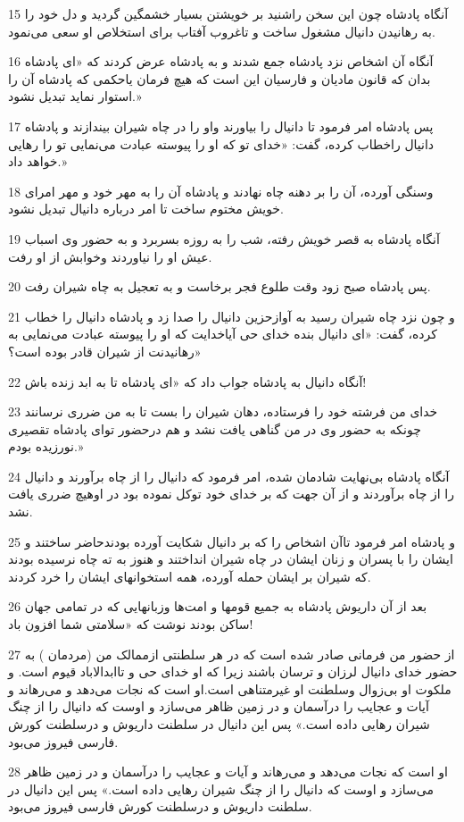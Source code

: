 \par 15 آنگاه پادشاه چون این سخن راشنید بر خویشتن بسیار خشمگین گردید و دل خود را به رهانیدن دانیال مشغول ساخت و تاغروب آفتاب برای استخلاص او سعی می‌نمود.
\par 16 آنگاه آن اشخاص نزد پادشاه جمع شدند و به پادشاه عرض کردند که «ای پادشاه بدان که قانون مادیان و فارسیان این است که هیچ فرمان یاحکمی که پادشاه آن را استوار نماید تبدیل نشود.»
\par 17 پس پادشاه امر فرمود تا دانیال را بیاورند واو را در چاه شیران بیندازند و پادشاه دانیال راخطاب کرده، گفت: «خدای تو که او را پیوسته عبادت می‌نمایی تو را رهایی خواهد داد.»
\par 18 وسنگی آورده، آن را بر دهنه چاه نهادند و پادشاه آن را به مهر خود و مهر امرای خویش مختوم ساخت تا امر درباره دانیال تبدیل نشود.
\par 19 آنگاه پادشاه به قصر خویش رفته، شب را به روزه بسربرد و به حضور وی اسباب عیش او را نیاوردند وخوابش از او رفت.
\par 20 پس پادشاه صبح زود وقت طلوع فجر برخاست و به تعجیل به چاه شیران رفت.
\par 21 و چون نزد چاه شیران رسید به آوازحزین دانیال را صدا زد و پادشاه دانیال را خطاب کرده، گفت: «ای دانیال بنده خدای حی آیاخدایت که او را پیوسته عبادت می‌نمایی به رهانیدنت از شیران قادر بوده است؟»
\par 22 آنگاه دانیال به پادشاه جواب داد که «ای پادشاه تا به ابد زنده باش!
\par 23 خدای من فرشته خود را فرستاده، دهان شیران را بست تا به من ضرری نرسانند چونکه به حضور وی در من گناهی یافت نشد و هم درحضور تو‌ای پادشاه تقصیری نورزیده بودم.»
\par 24 آنگاه پادشاه بی‌نهایت شادمان شده، امر فرمود که دانیال را از چاه برآورند و دانیال را از چاه برآوردند و از آن جهت که بر خدای خود توکل نموده بود در اوهیچ ضرری یافت نشد.
\par 25 و پادشاه امر فرمود تاآن اشخاص را که بر دانیال شکایت آورده بودندحاضر ساختند و ایشان را با پسران و زنان ایشان در چاه شیران انداختند و هنوز به ته چاه نرسیده بودند که شیران بر ایشان حمله آورده، همه استخوانهای ایشان را خرد کردند.
\par 26 بعد از آن داریوش پادشاه به جمیع قومها و امت‌ها وزبانهایی که در تمامی جهان ساکن بودند نوشت که «سلامتی شما افزون باد!
\par 27 از حضور من فرمانی صادر شده است که در هر سلطنتی ازممالک من (مردمان ) به حضور خدای دانیال لرزان و ترسان باشند زیرا که او خدای حی و تاابدالاباد قیوم است. و ملکوت او بی‌زوال وسلطنت او غیرمتناهی است.او است که نجات می‌دهد و می‌رهاند و آیات و عجایب را درآسمان و در زمین ظاهر می‌سازد و اوست که دانیال را از چنگ شیران رهایی داده است.» پس این دانیال در سلطنت داریوش و درسلطنت کورش فارسی فیروز می‌بود.
\par 28 او است که نجات می‌دهد و می‌رهاند و آیات و عجایب را درآسمان و در زمین ظاهر می‌سازد و اوست که دانیال را از چنگ شیران رهایی داده است.» پس این دانیال در سلطنت داریوش و درسلطنت کورش فارسی فیروز می‌بود.

